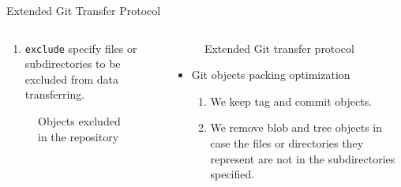\documentclass[final]{beamer}
\begin{document}
\begin{frame}[t, fragile]
\begin{columns}[t]
\begin{column}{.49\linewidth}
\begin{block}{Extended Git Transfer Protocol}
\begin{columns}[T]
\begin{column}{.5\textwidth}
\begin{itemize}
\begin{enumerate}
  \item \verb|exclude| specify files or subdirectories to be excluded from data
    transferring.
      \end{enumerate}
\end{itemize}
              \begin{figure} \centering
                \caption{Objects excluded in the repository}
              \end{figure}
\end{column}
          \begin{column}{.5\textwidth}
            \begin{figure} \centering
              \caption{Extended Git transfer protocol}
            \end{figure}
            \begin{itemize}
              \item Git objects packing optimization
    \begin{enumerate}
  \item We keep tag and commit objects.

  \item We remove blob and tree objects in case the files or directories they
    represent are not in the subdirectories specified.
\end{enumerate}
            \end{itemize}
          \end{column}
        \end{columns}


\end{block}
\end{column}
\end{columns}
\end{frame}
\end{document}
